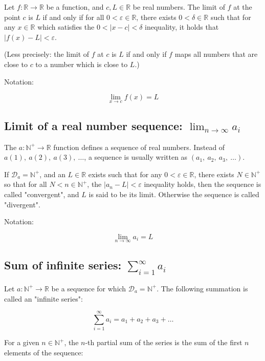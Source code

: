 \documentclass[titlepage]{article}
\begin{document}
        Let $f : \mathbb{R} \rightarrow \mathbb{R}$ be a function, and
        $c, L \in \mathbb{R}$ be real numbers. The limit of $f$ at the point
        $c$ is $L$ if and only if for all $0 < \varepsilon \in \mathbb{R}$,
        there exists $0 < \delta \in \mathbb{R}$ such that for any
        $x \in \mathbb{R}$ which satisfies the $0 < | x-c | < \delta$
        inequality, it holds that $| f(x) - L | < \varepsilon$.

        (Less precisely: the limit of $f$ at $c$ is $L$ if and only if $f$ maps
        all numbers that are close to $c$ to a number which is close to $L$.)

        Notation:

        $$\lim_{x \to c} f(x) = L$$

      \subsection{Limit of a real number sequence: $\lim_{n \to \infty} a_i$}

        The $a : \mathbb{N}^+ \rightarrow \mathbb{R}$ function defines a
        sequence of real numbers. Instead of $a(1),\ a(2),\ a(3),\ \ldots$, a
        sequence is usually written as $(a_1,\ a_2,\ a_3,\ \ldots)$.

        If $\mathcal{D}_a = \mathbb{N}^+$, and an $L \in \mathbb{R}$ exists
        such that for any $0 < \varepsilon \in \mathbb{R}$, there exists
        $N \in \mathbb{N}^+$ so that for all $N < n \in \mathbb{N}^+$, the
        $|a_n - L| < \varepsilon$ inequality holds, then the sequence is called
        "convergent", and $L$ is said to be its limit. Otherwise the sequence is
        called "divergent".

        Notation:

        $$\lim_{n \to \infty} a_i = L$$

      \subsection{Sum of infinite series: $\sum_{i=1}^\infty a_i$}

        Let $a : \mathbb{N}^+ \rightarrow \mathbb{R}$ be a sequence for which
        $\mathcal{D}_a = \mathbb{N}^+$. The following summation is called an
        "infinite series":

        $$\sum_{i=1}^\infty a_i = a_1 + a_2 + a_3 + \ldots$$

        For a given $n \in \mathbb{N}^+$, the $n$-th partial sum of the series
        is the sum of the first $n$ elements of the sequence:
\end{document}
